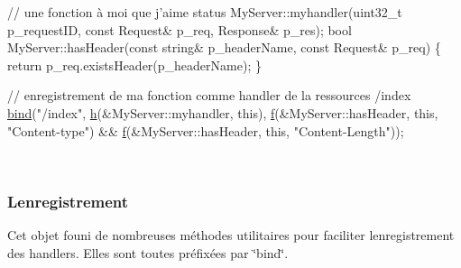 \begin{DoxyCode}
\textcolor{comment}{// une fonction à moi que j'aime}
status MyServer::myhandler(uint32\_t p\_requestID, \textcolor{keyword}{const} Request& p\_req, Response& p\_res);
\textcolor{keywordtype}{bool}  MyServer::hasHeader(\textcolor{keyword}{const} \textcolor{keywordtype}{string}& p\_headerName, \textcolor{keyword}{const} Request& p\_req)
\{
  \textcolor{keywordflow}{return} p\_req.existsHeader(p\_headerName);
\}

\textcolor{comment}{// enregistrement de ma fonction comme handler de la ressources /index}
\hyperlink{classxtd_1_1network_1_1http_1_1Server_aa964ab0b0c3ba29238cb2aae49181537}{bind}(\textcolor{stringliteral}{"/index"},
     \hyperlink{classxtd_1_1network_1_1http_1_1Server_af55090adba952bd4ddcd6eb467974ac8}{h}(&MyServer::myhandler, \textcolor{keyword}{this}),
     \hyperlink{classxtd_1_1network_1_1http_1_1Server_a94d4867ec740265b62b7505584387240}{f}(&MyServer::hasHeader, \textcolor{keyword}{this}, \textcolor{stringliteral}{"Content-type"}) &&
     \hyperlink{classxtd_1_1network_1_1http_1_1Server_a94d4867ec740265b62b7505584387240}{f}(&MyServer::hasHeader, \textcolor{keyword}{this}, \textcolor{stringliteral}{"Content-Length"}));
\end{DoxyCode}


~\newline
 \subsubsection*{L\textquotesingle{}enregistrement }

Cet objet founi de nombreuses méthodes utilitaires pour faciliter l\textquotesingle{}enregistrement des handlers. Elles sont toutes préfixées par \char`\"{}bind\char`\"{}.


